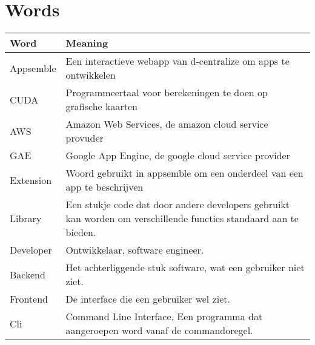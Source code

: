 \chapter{Words}
\begin{tabular}{|p{3cm}|p{11cm}|}
	\hline
	\textbf{Word} & \textbf{Meaning} \\
	\hline
	Appsemble & Een interactieve webapp van d-centralize om apps te ontwikkelen\\ \hline
	CUDA & Programmeertaal voor berekeningen te doen op grafische kaarten \\ \hline
	AWS & Amazon Web Services, de amazon cloud service provuder \\ \hline
	GAE & Google App Engine, de google cloud service provider \\ \hline
	Extension & Woord gebruikt in appsemble om een onderdeel van een app te beschrijven \\ \hline
	Library & Een stukje code dat door andere developers gebruikt kan worden om verschillende functies standaard aan te bieden. \\ \hline
	Developer & Ontwikkelaar, software engineer. \\ \hline
	Backend & Het achterliggende stuk software, wat een gebruiker niet ziet. \\ \hline
	Frontend & De interface die een gebruiker wel ziet. \\ \hline
	Cli & Command Line Interface. Een programma dat aangeroepen word vanaf de commandoregel. \\ \hline	
\end{tabular}